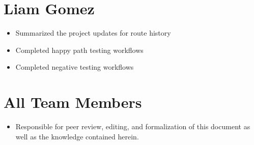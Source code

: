 \documentclass{scrreprt}
\begin{document}
	\section{Liam Gomez}
		\begin{itemize}
			\item Summarized the project updates for route history
			\item Completed happy path testing workflows
			\item Completed negative testing workflows
		\end{itemize}
	\section{All Team Members}
		\begin{itemize}
			\item Responsible for peer review, editing, and formalization of this document as well as the knowledge contained herein.
		\end{itemize}
\end{document}
